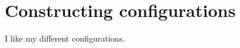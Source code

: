 \chapter{Constructing configurations} \label{ch:configuration}
I like my different configurations.



